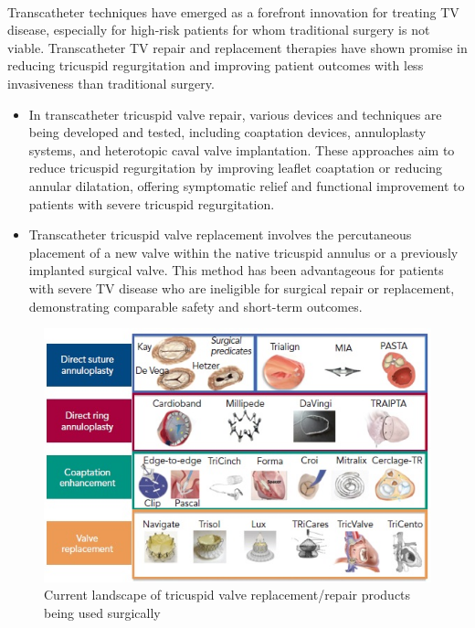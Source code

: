 \\
Transcatheter techniques have emerged as a forefront innovation for treating \gls{TV} disease, especially for high-risk patients for whom traditional surgery is not viable. Transcatheter \gls{TV} repair and replacement therapies have shown promise in reducing tricuspid regurgitation and improving patient outcomes with less invasiveness than traditional surgery.
\begin{itemize}
    \item In transcatheter tricuspid valve repair, various devices and techniques are being developed and tested, including coaptation devices, annuloplasty systems, and heterotopic caval valve implantation. These approaches aim to reduce tricuspid regurgitation by improving leaflet coaptation or reducing annular dilatation, offering symptomatic relief and functional improvement to patients with severe tricuspid regurgitation. ~

    \item Transcatheter tricuspid valve replacement involves the percutaneous placement of a new valve within the native tricuspid annulus or a previously implanted surgical valve. This method has been advantageous for patients with severe \gls{TV} disease who are ineligible for surgical repair or replacement, demonstrating comparable safety and short-term outcomes. ~
\end{itemize}
\begin{figure}[H]
    \centering
    \includegraphics[width=\linewidth]{figures/TTVR.jpg}
    \caption{Current landscape of tricuspid valve replacement/repair products being used surgically ~}
    \label{fig:TTVR}
\end{figure}

